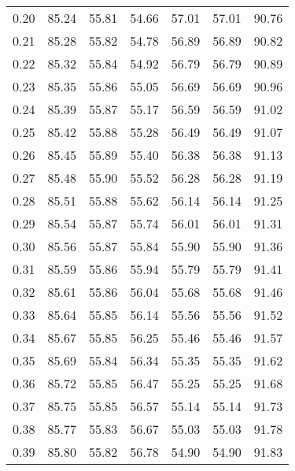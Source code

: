 \begin{tabular}{|c|c|c|c|c|c|c|}
      0.20 &     85.24 &     55.81 &      54.66 &   57.01 &      57.01 &         90.76 \\
      0.21 &     85.28 &     55.82 &      54.78 &   56.89 &      56.89 &         90.82 \\
      0.22 &     85.32 &     55.84 &      54.92 &   56.79 &      56.79 &         90.89 \\
      0.23 &     85.35 &     55.86 &      55.05 &   56.69 &      56.69 &         90.96 \\
      0.24 &     85.39 &     55.87 &      55.17 &   56.59 &      56.59 &         91.02 \\
      0.25 &     85.42 &     55.88 &      55.28 &   56.49 &      56.49 &         91.07 \\
      0.26 &     85.45 &     55.89 &      55.40 &   56.38 &      56.38 &         91.13 \\
      0.27 &     85.48 &     55.90 &      55.52 &   56.28 &      56.28 &         91.19 \\
      0.28 &     85.51 &     55.88 &      55.62 &   56.14 &      56.14 &         91.25 \\
      0.29 &     85.54 &     55.87 &      55.74 &   56.01 &      56.01 &         91.31 \\
      0.30 &     85.56 &     55.87 &      55.84 &   55.90 &      55.90 &         91.36 \\
      0.31 &     85.59 &     55.86 &      55.94 &   55.79 &      55.79 &         91.41 \\
      0.32 &     85.61 &     55.86 &      56.04 &   55.68 &      55.68 &         91.46 \\
      0.33 &     85.64 &     55.85 &      56.14 &   55.56 &      55.56 &         91.52 \\
      0.34 &     85.67 &     55.85 &      56.25 &   55.46 &      55.46 &         91.57 \\
      0.35 &     85.69 &     55.84 &      56.34 &   55.35 &      55.35 &         91.62 \\
      0.36 &     85.72 &     55.85 &      56.47 &   55.25 &      55.25 &         91.68 \\
      0.37 &     85.75 &     55.85 &      56.57 &   55.14 &      55.14 &         91.73 \\
      0.38 &     85.77 &     55.83 &      56.67 &   55.03 &      55.03 &         91.78 \\
      0.39 &     85.80 &     55.82 &      56.78 &   54.90 &      54.90 &         91.83 \\

\end{tabular}
